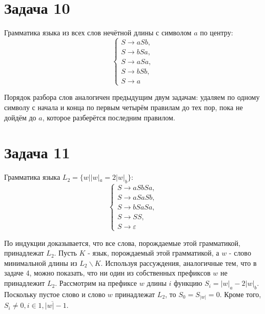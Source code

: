 \documentclass[11pt]{article}
\begin{document}
\section{Задача 10}
\label{sec:orge018182}
Грамматика языка из всех слов нечётной длины с символом \(a\) по центру:
\begin{equation}
\begin{cases}
S \rightarrow aSb, \\
S \rightarrow bSa, \\
S \rightarrow aSa, \\
S \rightarrow bSb, \\
S \rightarrow a
\end{cases}
\end{equation}

Порядок разбора слов аналогичен предыдущим двум задачам: удаляем по одному символу с начала
и конца по первым четырём правилам до тех пор, пока не дойдём до $a$, которое разберётся
последним правилом.
\section{Задача 11}
\label{sec:orgeea3002}
Грамматика языка \(L_2 = \{w | |w|_a = 2|w|_b\}\):
\begin{equation}
\begin{cases}
S \rightarrow aSbSa, \\
S \rightarrow aSaSb, \\
S \rightarrow bSaSa, \\
S \rightarrow SS, \\
S \rightarrow \varepsilon
\end{cases}
\end{equation}

По индукции доказывается, что все слова, порождаемые этой грамматикой, принадлежат $L_2$.
Пусть $K$ - язык, порождаемый этой грамматикой, а $w$ - слово минимальной длины из
$L_2 \backslash K$. Используя рассуждения, аналогичные тем, что в задаче 4, можно показать,
что ни один из собственных префиксов $w$ не принадлежит $L_2$. Рассмотрим на префиксе $w$ длины
$i$ функцию $S_i = |w|_a - 2|w|_b$. Поскольку пустое слово и слово $w$ принадлежат $L_2$, то
$S_0 = S_{|w|} = 0$. Кроме того, $S_i \neq 0, i \in \overline{1, |w| - 1}$.
\end{document}
